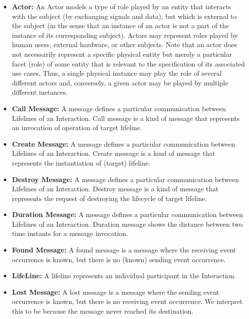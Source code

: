\begin{itemize}
	\item \textbf{Actor:} An Actor models a type of role played by an entity that interacts with the subject (by exchanging signals and data), but which is external to the subject (in the sense that an instance of an actor is not a part of the instance of its corresponding subject). Actors may represent roles played by human users, external hardware, or other subjects. Note that an actor does not necessarily represent a specific physical entity but merely a particular facet (role) of some entity that is relevant to the specification of its associated use cases. Thus, a single physical instance may play the role of several different actors and, conversely, a given actor may be played by multiple different instances.
	
	\item \textbf{Call Message:} A message defines a particular communication between Lifelines of an Interaction. Call message is a kind of message that represents an invocation of operation of target lifeline.
	
	\item \textbf{Create Message:} A message defines a particular communication between Lifelines of an Interaction. Create message is a kind of message that represents the instantiation of (target) lifeline.
	
	\item \textbf{Destroy Message:} A message defines a particular communication between Lifelines of an Interaction. Destroy message is a kind of message that represents the request of destroying the lifecycle of target lifeline.
	
	\item \textbf{Duration Message:} A message defines a particular communication between Lifelines of an Interaction. Duration message shows the distance between two time instants for a message invocation.
	
	\item \textbf{Found Message:} A found message is a message where the receiving event occurrence is known, but there is no (known) sending event occurrence. 
	
	\item \textbf{LifeLine:} A lifeline represents an individual participant in the Interaction.
	
	\item \textbf{Lost Message:} A lost message is a message where the sending event occurrence is known, but there is no receiving event occurrence. We interpret this to be because the message never reached its destination.
	

\end{itemize}
